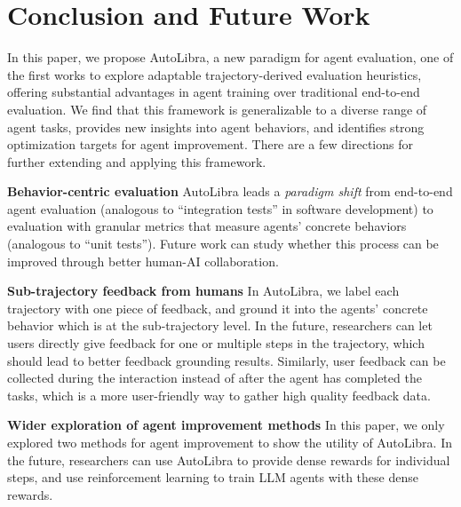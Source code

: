 \section{Conclusion and Future Work}
In this paper, we propose AutoLibra, a new paradigm for agent evaluation, one of
the first works to explore adaptable trajectory-derived evaluation heuristics,
offering substantial advantages in agent training over traditional end-to-end
evaluation. We find that this framework is generalizable to a diverse range of agent
tasks, provides new insights into agent behaviors, and identifies strong optimization
targets for agent improvement. There are a few directions for further extending
and applying this framework.

\textbf{Behavior-centric evaluation} AutoLibra leads a \emph{paradigm shift}
from end-to-end agent evaluation (analogous to ``integration tests'' in software
development) to evaluation with granular metrics that measure agents' concrete behaviors
(analogous to ``unit tests''). Future work can study whether this process can be
improved through better human-AI collaboration.

\textbf{Sub-trajectory feedback from humans} In AutoLibra, we label each
trajectory with one piece of feedback, and ground it into the agents' concrete
behavior which is at the sub-trajectory level. In the future, researchers can
let users directly give feedback for one or multiple steps in the trajectory, which
should lead to better feedback grounding results. Similarly, user feedback can be
collected during the interaction instead of after the agent has completed the tasks,
which is a more user-friendly way to gather high quality feedback data.

\textbf{Wider exploration of agent improvement methods} In this paper, we only
explored two methods for agent improvement to show the utility of AutoLibra. In the
future, researchers can use AutoLibra to provide dense rewards for individual
steps, and use reinforcement learning to train LLM agents with these dense rewards.